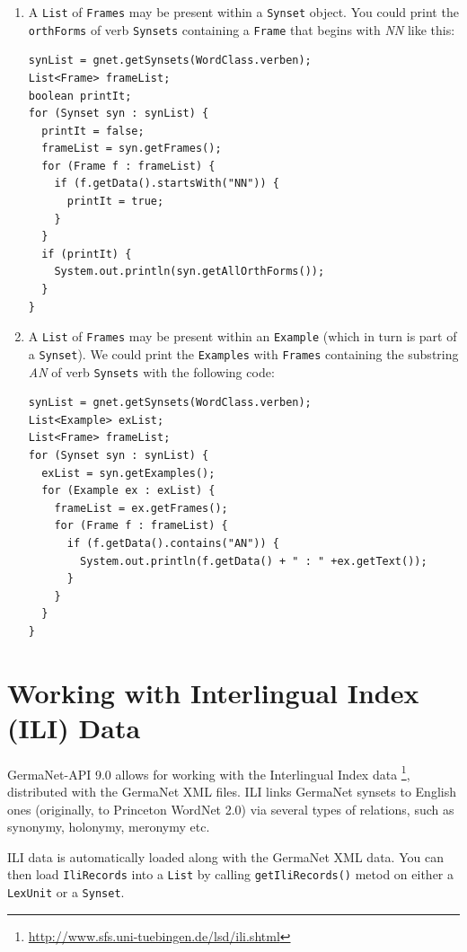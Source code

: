 \documentclass[12pt,a4paper,english,utf8]{report}
\begin{document}
\renewcommand{\labelenumi}{\arabic{enumi}}
\begin{enumerate}
	\item A \texttt{List} of \texttt{Frames} may be present within a \texttt{Synset} object. You could print the \texttt{orthForms} of verb \texttt{Synsets} containing a \texttt{Frame} that begins with \emph{NN} like this:
	
\begin{lstlisting}
synList = gnet.getSynsets(WordClass.verben);
List<Frame> frameList;
boolean printIt;
for (Synset syn : synList) {
  printIt = false;
  frameList = syn.getFrames();
  for (Frame f : frameList) {
    if (f.getData().startsWith("NN")) {
      printIt = true;
    }
  }
  if (printIt) {
    System.out.println(syn.getAllOrthForms());
  }
}
\end{lstlisting}

\item A \texttt{List} of \texttt{Frames} may be present within an \texttt{Example} (which in turn is part of a \texttt{Synset}). We could print the \texttt{Examples} with \texttt{Frames} containing the substring \emph{AN} of verb \texttt{Synsets} with the following code:

\begin{lstlisting}
synList = gnet.getSynsets(WordClass.verben);
List<Example> exList;
List<Frame> frameList;
for (Synset syn : synList) {
  exList = syn.getExamples();
  for (Example ex : exList) {
    frameList = ex.getFrames();
    for (Frame f : frameList) {
      if (f.getData().contains("AN")) {
        System.out.println(f.getData() + " : " +ex.getText());
      }
    }
  }
}
\end{lstlisting}

\end{enumerate}



\section{Working with Interlingual Index (ILI) Data}
GermaNet-API 9.0 allows for working with the Interlingual Index data \footnote{\url{http://www.sfs.uni-tuebingen.de/lsd/ili.shtml}}, distributed with the GermaNet XML files. ILI links GermaNet synsets to English ones (originally, to Princeton WordNet 2.0) via several types of relations, such as synonymy, holonymy, meronymy etc. 

ILI data is automatically loaded along with the GermaNet XML data. You can then load \texttt{IliRecords} into a \texttt{List} by calling \texttt{getIliRecords()} metod on either a \texttt{LexUnit} or a \texttt{Synset}. 
\end{document}
